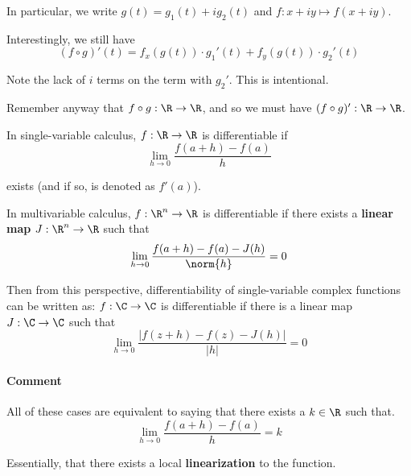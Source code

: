In particular, we write $g(t)=g_1(t)+ig_2(t)$ and $f:x+iy\mapsto
	f(x+iy)$.

Interestingly, we still have
$$
	(f\circ g)'(t) =
	f_x(g(t))\cdot {g_1}'(t)+f_y(g(t))\cdot {g_2}'(t)
$$

Note the lack of $i$ terms on the term with ${g_2}'$. This is
intentional.

Remember anyway that $f\circ g:\R\to\R$, and so we must have $(f\circ
	g)':\R\to\R$.

\label{c62315d}

In single-variable calculus, $f:\R\to\R$ is differentiable if
$$
	\lim_{h\to0}\frac{f(a+h)-f(a)}h
$$

exists (and if so, is denoted as $f'(a)$).

In multivariable calculus, $f:\R^n\to\R$ is differentiable if there
exists a \textbf{linear map} $J:\R^n\to\R$ such that
$$
	\lim_{h\to0}\frac{f(a+h)-f(a)-J(h)}{\norm{h}}=0
$$

Then from this perspective, differentiability of single-variable
complex functions can be written as:
$f:\C\to\C$ is differentiable if there is a linear map $J:\C\to\C$ such that
$$
	\lim_{h\to0}\frac{|f(z+h)-f(z)-J(h)|}{|h|}=0
$$

\paragraph{Comment}

All of these cases are equivalent to saying that there exists a
$k\in\R$ such that.
$$
	\lim_{h\to0}\frac{f(a+h)-f(a)}h=k
$$

Essentially, that there exists a local \textbf{linearization} to the
function.